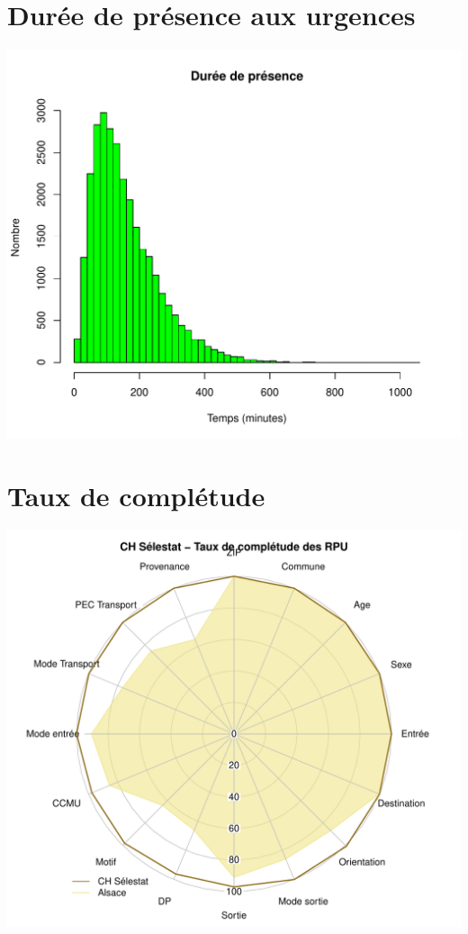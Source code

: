 \documentclass[12pt,english,french,twoside]{book}\usepackage[]{graphicx}\usepackage[]{color}
\makeatletter
\def\maxwidth{ %
  \ifdim\Gin@nat@width>\linewidth
    \linewidth
  \else
    \Gin@nat@width
  \fi
}
\newenvironment{knitrout}{}{} %
\makeatother
\begin{document}
\section*{Durée de présence aux urgences}

\begin{knitrout}
\color{fgcolor}
\includegraphics[width=\maxwidth]{figure/graphe_p_sel} 

\end{knitrout}


\section*{Taux de complétude}

\begin{knitrout}
\color{fgcolor}
\includegraphics[width=\maxwidth]{figure/compl_sel} 

\end{knitrout}
\end{document}
